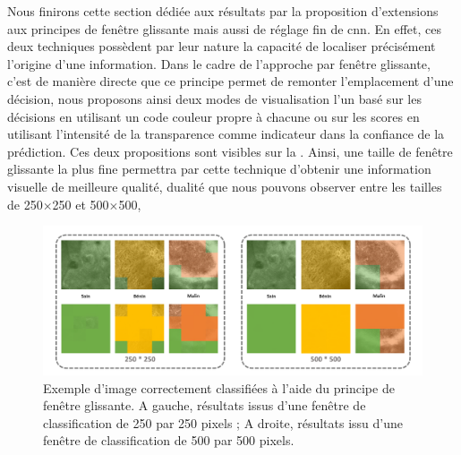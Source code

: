 Nous finirons cette section dédiée aux résultats par la proposition d'extensions aux principes de fenêtre glissante mais aussi de réglage fin de \gls{cnn}. En effet, ces deux techniques possèdent par leur nature la capacité de localiser précisément l'origine d'une information. Dans le cadre de l'approche par fenêtre glissante, c'est de manière directe que ce principe permet de remonter l'emplacement d'une décision, nous proposons ainsi deux modes de visualisation l'un basé sur les décisions en utilisant un code couleur propre à chacune ou sur les scores en utilisant l'intensité de la transparence comme indicateur dans la confiance de la prédiction. Ces deux propositions sont visibles sur la . Ainsi, une taille de fenêtre glissante la plus fine permettra par cette technique d'obtenir une information visuelle de meilleure qualité, dualité que nous pouvons observer entre les tailles de 250$\times$250 et 500$\times$500,\par

\begin{figure}[H]
    \centering
    \includegraphics[width=\linewidth]{contents/chapter_6/resources/exemple_image_improvement_well.pdf}
    \caption{Exemple d'image correctement classifiées à l'aide du principe de fenêtre glissante. A gauche, résultats issus d'une fenêtre de classification de 250 par 250 pixels ; A droite, résultats issu d'une fenêtre de classification de 500 par 500 pixels.}
    \label{fig:exemple_image_improvement_well}
\end{figure}\par

